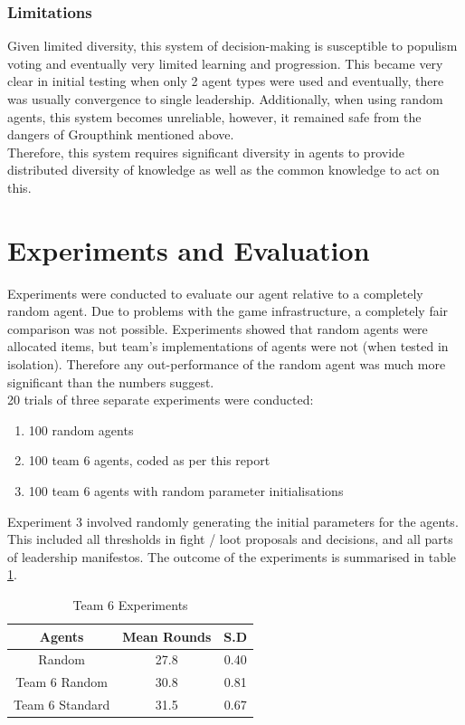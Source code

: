 \subsubsection{Limitations}

Given limited diversity, this system of decision-making is susceptible to populism voting and eventually very limited learning and progression. This became very clear in initial testing when only 2 agent types were used and eventually, there was usually convergence to single leadership. Additionally, when using random agents, this system becomes unreliable, however, it remained safe from the dangers of Groupthink mentioned above.\\

Therefore, this system requires significant diversity in agents to provide distributed diversity of knowledge as well as the common knowledge to act on this. 


\section{Experiments and Evaluation}

Experiments were conducted to evaluate our agent relative to a completely random agent. Due to problems with the game infrastructure, a completely fair comparison was not possible. Experiments showed that random agents were allocated items, but team's implementations of agents were not (when tested in isolation). Therefore any out-performance of the random agent was much more significant than the numbers suggest.\\

20 trials of three separate experiments were conducted:

\begin{enumerate}
    \item 100 random agents
    \item 100 team 6 agents, coded as per this report
    \item 100 team 6 agents with random parameter initialisations
\end{enumerate}

Experiment 3 involved randomly generating the initial parameters for the agents. This included all thresholds in fight / loot proposals and decisions, and all parts of leadership manifestos. The outcome of the experiments is summarised in table \ref{tab:T6Experiments}.

\begin{table}[h]
    \centering
    \begin{tabular}{||c|c|c||}
        \hline
       Agents & Mean Rounds & S.D\\
       \hline \hline
       Random & 27.8 & 0.40\\
       \hline
       Team 6 Random & 30.8 & 0.81\\
       \hline
       Team 6 Standard & 31.5 & 0.67\\
       \hline
    \end{tabular}
    \caption{Team 6 Experiments}
    \label{tab:T6Experiments}
\end{table}

